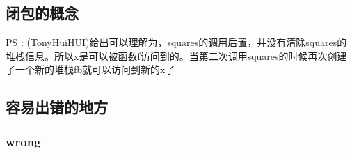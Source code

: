 \hypertarget{ux95edux5305ux7684ux6982ux5ff5}{%
\subsection{闭包的概念}\label{ux95edux5305ux7684ux6982ux5ff5}}

\begin{Shaded}
\begin{Highlighting}[]
\NormalTok{() }\NormalTok{ \{}
   \NormalTok{() }\NormalTok{ \{}
\NormalTok{  \}}
\NormalTok{\}}

\NormalTok{\}}
\end{Highlighting}
\end{Shaded}

PS :
(TonyHuiHUI)给出可以理解为，squares的调用后置，并没有清除squares的堆栈信息。所以x是可以被函数f访问到的。当第二次调用squares的时候再次创建了一个新的堆栈fb就可以访问到新的x了

\hypertarget{ux5bb9ux6613ux51faux9519ux7684ux5730ux65b9}{%
\subsection{容易出错的地方}\label{ux5bb9ux6613ux51faux9519ux7684ux5730ux65b9}}

\hypertarget{wrong}{%
\subsubsection{wrong}\label{wrong}}

\begin{Shaded}
\begin{Highlighting}[]
\NormalTok{()}

\NormalTok{)}
\NormalTok{() \{}
\CommentTok{// }
\NormalTok{  \})}
\NormalTok{\}}
\end{Highlighting}
\end{Shaded}

